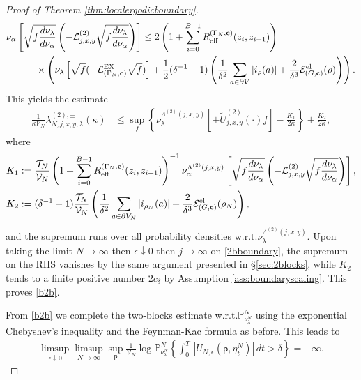 \documentclass[11pt]{amsart}
\theoremstyle{plain}
\theoremstyle{definition}
\theoremstyle{remark}
\newcommand{\pt}{\mathsf{p}}
\begin{document}
\begin{proof}[Proof of Theorem \ref{thm:localergodicboundary}]
\begin{align*}
\nu_\alpha&\left[\sqrt{f\frac{d\nu_\lambda}{d\nu_\alpha}}\left(-\mathcal{L}^{(2)}_{j,x,y}\sqrt{ f\frac{d\nu_\lambda}{d\nu_\alpha}}\right) \right] 
\leq 2\left(1+\sum_{i=0}^{B-1} R_{\rm eff}^{(\Gamma_N, {\bf c})}(z_i, z_{i+1})\right) \\
 & \qquad \times\left( \nu_\lambda\left[\sqrt{f}(-\mathcal{L}^{\rm EX}_{(\Gamma_N,{\bf c})} \sqrt{f})\right] +\frac{1}{2}(\delta^{-1}-1)\left(\frac{1}{\delta^2} \sum_{a\in \partial V} |i_\rho(a)| + \frac{2}{\delta^3} \mathcal{E}^{\rm el}_{(G,{\bf c})} (\rho) \right)\right).
\end{align*}
This yields the estimate
\begin{align}
\label{2bboundary}
\frac{1}{\kappa \mathcal{V}_N}\lambda^{(2),\pm}_{N,j,x,y,\lambda}(\kappa) & \leq \sup_f\left\{\nu^{\Lambda^{(2)}(j,x,y)}_\lambda\left[\pm \tilde{U}^{(2)}_{j,x,y}(\cdot)f\right]-\frac{K_1}{2\kappa} \right\} + \frac{K_2}{2\kappa},
\end{align}
where
\begin{align*}
K_1 &:= \frac{\mathcal{T}_N}{\mathcal{V}_N}\left(1+ \sum_{i=0}^{B-1} R_{\rm eff}^{(\Gamma_N, {\bf c})}(z_i, z_{i+1})\right)^{-1}\nu_\alpha^{\Lambda^{(2)}(j,x,y)}\left[\sqrt{f\frac{d\nu_\lambda}{d\nu_\alpha}}\left(-\mathcal{L}^{(2)}_{j,x,y} \sqrt{f\frac{d\nu_\lambda}{d\nu_\alpha}}\right)\right] ,\\
K_2 &:= (\delta^{-1}-1)\frac{\mathcal{T}_N}{\mathcal{V}_N}\left(\frac{1}{\delta^2} \sum_{a\in \partial V_N} |i_{\rho_N}(a)| + \frac{2}{\delta^3} \mathcal{E}^{\rm el}_{(G,{\bf c})} (\rho_N)\right),
\end{align*}
and the supremum runs over all probability densities w.r.t.\@ $\nu_\lambda^{\Lambda^{(2)}(j,x,y)}$.
Upon taking the limit $N\to\infty$ then $\epsilon\downarrow 0$ then $j\to\infty$ on \eqref{2bboundary}, the supremum on the RHS vanishes by the same argument presented in \S\ref{sec:2blocks}, while $K_2$ tends to a finite positive number $2 c_{\delta}$ by  Assumption \ref{ass:boundaryscaling}. This proves \eqref{b2b}.

From \eqref{b2b} we complete the two-blocks estimate w.r.t.\@ $\mathbb{P}^N_{\nu_\lambda^N}$ using the exponential Chebyshev's inequality and the Feynman-Kac formula as before. This leads to
\begin{align}
\label{bdsup}
\limsup_{\epsilon\downarrow 0} \limsup_{N\to\infty} \sup_\pt \frac{1}{\mathcal{V}_N} \log \mathbb{P}^N_{\nu^N_\lambda} \left\{ \int_0^T\, \left|U_{N,\epsilon}(\pt,\eta^N_t)\right|\,dt>\delta\right\} = -\infty.
\end{align}


\end{proof}
\end{document}
